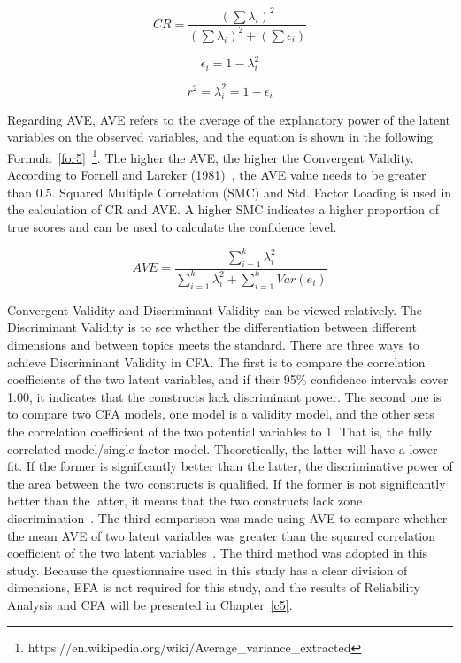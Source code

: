 \begin{equation}
\label{for2}
CR=\frac{(\sum \lambda_i )^2}{(\sum \lambda_i )^2+(\sum \epsilon _i )}
\end{equation}

\begin{equation}
\label{for3}
\epsilon_i = 1-\lambda_i^2  
\end{equation}

\begin{equation}
\label{for4}
r^2 = \lambda_i^2 = 1- \epsilon_i  
\end{equation}

Regarding AVE, AVE refers to the average of the explanatory power of the latent variables on the observed variables, and the equation is shown in the following Formula~\ref{for5}~\footnote{https://en.wikipedia.org/wiki/Average\_variance\_extracted}. The higher the AVE, the higher the Convergent Validity. According to Fornell and Larcker (1981)~\cite{ref31}, the AVE value needs to be greater than 0.5. Squared Multiple Correlation (SMC) and Std. Factor Loading is used in the calculation of CR and AVE. A higher SMC indicates a higher proportion of true scores and can be used to calculate the confidence level.

\begin{equation}
\label{for5}
AVE = \frac{\sum_{i=1}^{k} \lambda_i^2 }{\sum_{i=1}^{k} \lambda_i^2+\sum_{i=1}^{k} Var(e_i)}
\end{equation}

Convergent Validity and Discriminant Validity can be viewed relatively. The Discriminant Validity is to see whether the differentiation between different dimensions and between topics meets the standard. There are three ways to achieve Discriminant Validity in CFA. The first is to compare the correlation coefficients of the two latent variables, and if their 95\% confidence intervals cover 1.00, it indicates that the constructs lack discriminant power. The second one is to compare two CFA models, one model is a validity model, and the other sets the correlation coefficient of the two potential variables to 1. That is, the fully correlated model/single-factor model. Theoretically, the latter will have a lower fit. If the former is significantly better than the latter, the discriminative power of the area between the two constructs is qualified. If the former is not significantly better than the latter, it means that the two constructs lack zone discrimination~\cite{ref34,ref35}. The third comparison was made using AVE to compare whether the mean AVE of two latent variables was greater than the squared correlation coefficient of the two latent variables~\cite{ref31}. The third method was adopted in this study. Because the questionnaire used in this study has a clear division of dimensions, EFA is not required for this study, and the results of Reliability Analysis and CFA will be presented in Chapter~\ref{c5}.


